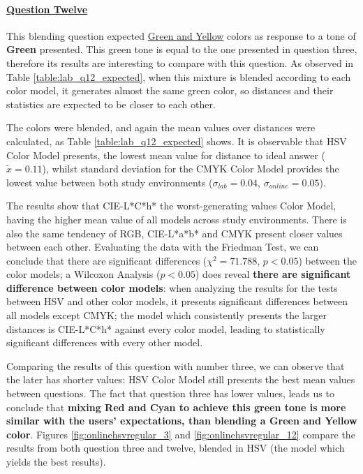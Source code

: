 \paragraph{\ul{Question Twelve}}
%
This blending question expected \ul{Green and Yellow} colors as response to a tone of \textbf{Green} presented. This green tone is equal to the one presented in question three, therefore
its results are interesting to compare with this question. As observed in Table \ref{table:lab_q12_expected}, when this mixture is blended according to each color model, it generates almost
the same green color, so distances and their statistics are expected to be closer to each other. \par
%
The colors were blended, and again the mean values over distances were calculated, as Table \ref{table:lab_q12_expected} shows. It is observable that HSV Color Model presents,
the lowest mean value for distance to ideal answer ($\tilde{x} = 0.11$), whilst standard deviation for the CMYK Color Model provides the lowest value between both study environments
($\sigma_{lab} = 0.04$, $\sigma_{online} = 0.05$). \par
%
The results show that CIE-L*C*h* the worst-generating values Color Model, having the higher mean value of all models across study environments. There is also the same tendency of RGB,
CIE-L*a*b* and CMYK present closer values between each other. Evaluating the data with the Friedman Test, we can conclude that there are significant differences ($\chi^2 = 71.788$, $p < 0.05$)
between the color models; a Wilcoxon Analysis ($p < 0.05$) does reveal \textbf{there are significant difference between color models}: when analyzing the results for the tests between HSV and other
color models, it presents significant differences between all models except CMYK; the model which consistently presents the larger distances is CIE-L*C*h* against every color model, leading to
statistically significant differences with every other model. \par
%
Comparing the results of this question with number three, we can observe that the later has shorter values: HSV Color Model still presents the best mean values between questions.
The fact that question three has lower values, leads us to conclude that \textbf{mixing Red and Cyan to achieve this green tone is more similar with the users' expectations, than blending a Green and
Yellow color}. Figures \ref{fig:onlinehsvregular_3} and \ref{fig:onlinehsvregular_12} compare the results from both question three and twelve, blended in HSV (the model which yields the best results). \par
